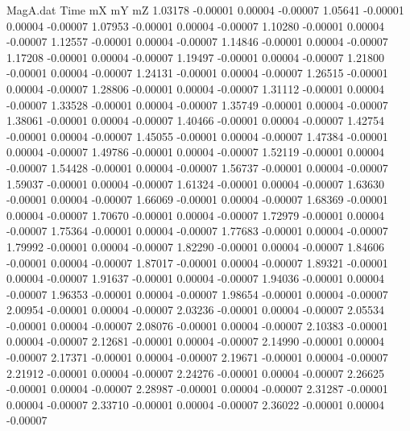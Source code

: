 \begin{filecontents}{MagA.dat}
Time mX mY mZ
   1.03178   -0.00001    0.00004   -0.00007
   1.05641   -0.00001    0.00004   -0.00007
   1.07953   -0.00001    0.00004   -0.00007
   1.10280   -0.00001    0.00004   -0.00007
   1.12557   -0.00001    0.00004   -0.00007
   1.14846   -0.00001    0.00004   -0.00007
   1.17208   -0.00001    0.00004   -0.00007
   1.19497   -0.00001    0.00004   -0.00007
   1.21800   -0.00001    0.00004   -0.00007
   1.24131   -0.00001    0.00004   -0.00007
   1.26515   -0.00001    0.00004   -0.00007
   1.28806   -0.00001    0.00004   -0.00007
   1.31112   -0.00001    0.00004   -0.00007
   1.33528   -0.00001    0.00004   -0.00007
   1.35749   -0.00001    0.00004   -0.00007
   1.38061   -0.00001    0.00004   -0.00007
   1.40466   -0.00001    0.00004   -0.00007
   1.42754   -0.00001    0.00004   -0.00007
   1.45055   -0.00001    0.00004   -0.00007
   1.47384   -0.00001    0.00004   -0.00007
   1.49786   -0.00001    0.00004   -0.00007
   1.52119   -0.00001    0.00004   -0.00007
   1.54428   -0.00001    0.00004   -0.00007
   1.56737   -0.00001    0.00004   -0.00007
   1.59037   -0.00001    0.00004   -0.00007
   1.61324   -0.00001    0.00004   -0.00007
   1.63630   -0.00001    0.00004   -0.00007
   1.66069   -0.00001    0.00004   -0.00007
   1.68369   -0.00001    0.00004   -0.00007
   1.70670   -0.00001    0.00004   -0.00007
   1.72979   -0.00001    0.00004   -0.00007
   1.75364   -0.00001    0.00004   -0.00007
   1.77683   -0.00001    0.00004   -0.00007
   1.79992   -0.00001    0.00004   -0.00007
   1.82290   -0.00001    0.00004   -0.00007
   1.84606   -0.00001    0.00004   -0.00007
   1.87017   -0.00001    0.00004   -0.00007
   1.89321   -0.00001    0.00004   -0.00007
   1.91637   -0.00001    0.00004   -0.00007
   1.94036   -0.00001    0.00004   -0.00007
   1.96353   -0.00001    0.00004   -0.00007
   1.98654   -0.00001    0.00004   -0.00007
   2.00954   -0.00001    0.00004   -0.00007
   2.03236   -0.00001    0.00004   -0.00007
   2.05534   -0.00001    0.00004   -0.00007
   2.08076   -0.00001    0.00004   -0.00007
   2.10383   -0.00001    0.00004   -0.00007
   2.12681   -0.00001    0.00004   -0.00007
   2.14990   -0.00001    0.00004   -0.00007
   2.17371   -0.00001    0.00004   -0.00007
   2.19671   -0.00001    0.00004   -0.00007
   2.21912   -0.00001    0.00004   -0.00007
   2.24276   -0.00001    0.00004   -0.00007
   2.26625   -0.00001    0.00004   -0.00007
   2.28987   -0.00001    0.00004   -0.00007
   2.31287   -0.00001    0.00004   -0.00007
   2.33710   -0.00001    0.00004   -0.00007
   2.36022   -0.00001    0.00004   -0.00007

\end{filecontents}
